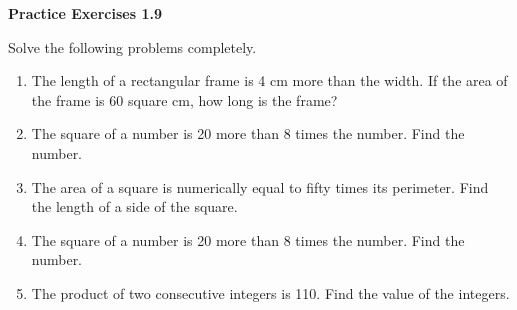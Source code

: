 \vspace{0.3ex}
\noindent\textbf{Practice Exercises 1.9}


Solve the following problems completely.

\begin{enumerate}%
   \item The length of a rectangular frame is 4 cm more than the width. If the
   	area of the frame is 60 square cm, how long is the frame?
   \item The square of a number is 20 more than 8 times the number. Find the
    	number.
   \item The area of a square is numerically equal to fifty times its perimeter. Find the length of a side of the square.
   \item The square of a number is 20 more than 8 times the number.  Find the number.
   \item The product of two consecutive integers is 110. Find the value of the integers.
\end{enumerate}
				
				

